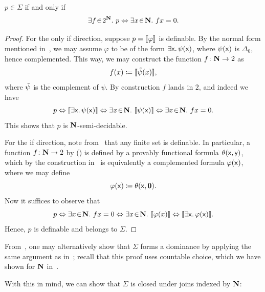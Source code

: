 \begin{proposition}\label{prop:definablearesemi-decidale}
  $p\in\Sigma$ if and only if
  \[  \exists f\!\in\!2^{\mathbf N}.\  p \Leftrightarrow \exists x\!\in\!\mathbf N.\  fx = 0. \]
\end{proposition}
\begin{proof}
  For the only if direction, suppose $p = \llbracket\varphi\rrbracket$ is definable. By the normal form mentioned in~, we may assume $\varphi$ to be of the form $\exists\mathsf{x}.\,\psi(\mathsf{x})$, where $\psi(\mathsf{x})$ is $\Delta_0$, hence complemented. This way, we may construct the function $f \colon \mathbf N \to 2$ as 
  \[ f(x) \coloneq \llbracket\tilde{\psi}(x)\rrbracket, \]
  where $\tilde{\psi}$ is the complement of $\psi$. By construction $f$ lands in $2$, and indeed we have 
  \[ p \Leftrightarrow \llbracket\exists\mathsf{x}.\,\psi(\mathsf{x})\rrbracket \Leftrightarrow \exists x\!\in\!\mathbf N.\  \llbracket\psi(\mathsf{x})\rrbracket \Leftrightarrow \exists x\!\in\!\mathbf N.\  fx = 0. \]
  This shows that $p$ is $\mathbf N$-semi-decidable.

  For the if direction, note from~ that any finite set is definable. In particular, a function $f \colon \mathbf N \to 2$ by (\AxiomSQCA) is defined by a provably functional formula $\theta(\mathsf{x},\mathsf{y})$, which by the construction in~ is equivalently a complemented formula $\varphi(\mathsf{x})$, where we may define 
  \[ \varphi(\mathsf{x}) \coloneq \theta(\mathsf{x},\mathbf{0}). \]
  Now it suffices to observe that 
  \[ p \Leftrightarrow \exists x\!\in\!\mathbf N.\  fx = 0 \Leftrightarrow \exists x\!\in\!\mathbf N.\  \llbracket\varphi(x)\rrbracket \Leftrightarrow \llbracket\exists\mathsf{x}.\,\varphi(\mathsf{x})\rrbracket. \]
  Hence, $p$ is definable and belongs to $\Sigma$.
\end{proof}

\begin{remark}
  From~, one may alternatively show that $\Sigma$ forms a dominance by applying the same argument as in~\citet[Prop.~5.2.1]{rosolini1986continuity}; recall that this proof uses countable choice, which we have shown for $\mathbf N$ in~. 
\end{remark}

With this in mind, we can show that $\Sigma$ is closed under joins indexed by $\mathbf N$:

